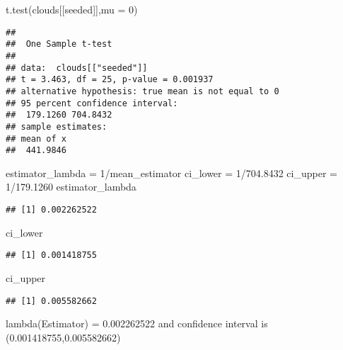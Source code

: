 \documentclass[
]{article}
\newenvironment{Shaded}{\begin{snugshade}}{\end{snugshade}}
\newcommand{\AttributeTok}[1]{\textcolor[rgb]{0.77,0.63,0.00}{#1}}
\newcommand{\DecValTok}[1]{\textcolor[rgb]{0.00,0.00,0.81}{#1}}
\newcommand{\FloatTok}[1]{\textcolor[rgb]{0.00,0.00,0.81}{#1}}
\newcommand{\FunctionTok}[1]{\textcolor[rgb]{0.00,0.00,0.00}{#1}}
\newcommand{\NormalTok}[1]{#1}
\newcommand{\OtherTok}[1]{\textcolor[rgb]{0.56,0.35,0.01}{#1}}
\newcommand{\SpecialCharTok}[1]{\textcolor[rgb]{0.00,0.00,0.00}{#1}}
\newcommand{\StringTok}[1]{\textcolor[rgb]{0.31,0.60,0.02}{#1}}
\begin{document}
\begin{Shaded}
\begin{Highlighting}[]
\FunctionTok{t.test}\NormalTok{(clouds[[}\StringTok{\textquotesingle{}seeded\textquotesingle{}}\NormalTok{]],}\AttributeTok{mu =} \DecValTok{0}\NormalTok{)}
\end{Highlighting}
\end{Shaded}

\begin{verbatim}
## 
##  One Sample t-test
## 
## data:  clouds[["seeded"]]
## t = 3.463, df = 25, p-value = 0.001937
## alternative hypothesis: true mean is not equal to 0
## 95 percent confidence interval:
##  179.1260 704.8432
## sample estimates:
## mean of x 
##  441.9846
\end{verbatim}

\begin{Shaded}
\begin{Highlighting}[]
\NormalTok{estimator\_lambda }\OtherTok{=} \DecValTok{1}\SpecialCharTok{/}\NormalTok{mean\_estimator}
\NormalTok{ci\_lower }\OtherTok{=} \DecValTok{1}\SpecialCharTok{/}\FloatTok{704.8432}
\NormalTok{ci\_upper }\OtherTok{=} \DecValTok{1}\SpecialCharTok{/}\FloatTok{179.1260}
\NormalTok{estimator\_lambda}
\end{Highlighting}
\end{Shaded}

\begin{verbatim}
## [1] 0.002262522
\end{verbatim}

\begin{Shaded}
\begin{Highlighting}[]
\NormalTok{ci\_lower}
\end{Highlighting}
\end{Shaded}

\begin{verbatim}
## [1] 0.001418755
\end{verbatim}

\begin{Shaded}
\begin{Highlighting}[]
\NormalTok{ci\_upper}
\end{Highlighting}
\end{Shaded}

\begin{verbatim}
## [1] 0.005582662
\end{verbatim}

lambda(Estimator) = 0.002262522 and confidence interval is
(0.001418755,0.005582662)
\end{document}
